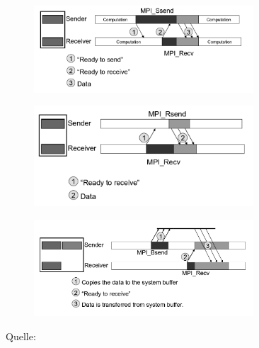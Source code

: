     \begin{figure}[t]
      \begin{subfigure}[c]{0.53\textwidth}
	\includegraphics[width=0.9\textwidth]{img/SyncSend_gray.png}
	\label{fig:sync_send}
      \end{subfigure}
      \begin{subfigure}[c]{0.45\textwidth}
	\includegraphics[width=0.9\textwidth]{img/ReadySend_gray.png}
	\label{fig:ready_send}
      \end{subfigure}
      \begin{subfigure}[c]{0.5\textwidth}
	\includegraphics[width=0.9\textwidth]{img/BufferedSend_gray.png}
	\label{fig:buff_send}
      \end{subfigure}
      \caption{Quelle: \citet{mpi_p2p}}
      \label{fig:send_var}
    \end{figure}
    
